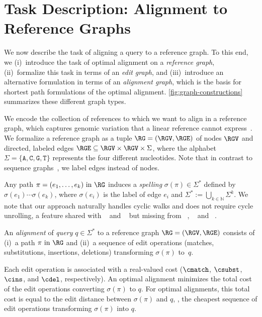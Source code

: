 \section{Task Description: Alignment to Reference Graphs} \label{sec:task}

We now describe the task of aligning a query to a reference graph. To this end,
we (i)~introduce the task of optimal alignment on a \emph{reference graph},
(ii)~formalize this task in terms of an \emph{edit graph}, and (iii)~introduce an
alternative formulation in terms of an \emph{alignment graph}, which is the
basis for shortest path formulations of the optimal alignment.
%
\cref{fig:graph-constructions} summarizes these different graph types.

We encode the collection of references to which we want to align in a reference
graph, which captures genomic variation that a linear reference cannot
express~\cite{paten_genome_2017,garrison_variation_2018}.
%
We formalize a reference graph as a tuple $\RG=(\RGV,\RGE)$ of nodes $\RGV$ and
directed, labeled edges $\RGE \subseteq \RGV \times \RGV \times \Sigma$, where
the alphabet $\Sigma=\{\texttt{A},\texttt{C},\texttt{G},\texttt{T}\}$ represents
the four different nucleotides.
%
Note that in contrast to sequence graphs~\cite{rautiainen_aligning_2017}, we
label edges instead of nodes.

Any path $\pi=(e_1,\dots,e_k) \text { in } \RG$ induces a \emph{spelling}
$\sigma(\pi) \in \Sigma^*$ defined by $\sigma(e_1)\cdots\sigma(e_k)$, where
$\sigma(e_i)$ is the label of edge $e_i$ and $\Sigma^* := \bigcup_{k \in
\mathbb{N}} \Sigma^k$. We note that our approach naturally handles cyclic walks
and does not require cycle unrolling, a feature shared with
\bitparallel~\cite{rautiainen_bitparallel_2019} and
\brownie~\cite{heydari_browniealigner_2018} but missing from
\vg~\cite{garrison_variation_2018}, \pasgal~\cite{jain_accelerating_2019} and
\valigntool~\cite{kavya_sequence_2019}.

An \emph{alignment} of \emph{query} $q \in \Sigma^*$ to a reference graph
$\RG=(\RGV,\RGE)$ consists of (i)~a path $\pi \text{ in } \RG$ and (ii)~a
sequence of edit operations (matches, substitutions, insertions, deletions)
transforming $\sigma(\pi)$ to~$q$.

Each edit operation is associated with a real-valued cost ($\cmatch$, $\csubst$,
$\cins$, and $\cdel$, respectively).
An optimal alignment minimizes the total cost of the edit operations converting
$\sigma(\pi)$ to $q$. For optimal alignments, this total cost is equal to the
edit distance between $\sigma(\pi)$ and $q$, \ie, the cheapest sequence of edit
operations transforming $\sigma(\pi)$ into $q$.

